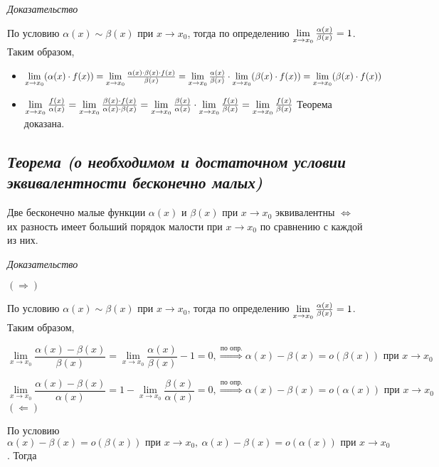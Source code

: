 \textit{Доказательство}

По условию $\alpha(x)\sim\beta(x)$ при $x \rightarrow x_0$, тогда по определению $\lim\limits_{x \to x_0}{\Large\frac{\alpha(x)}{\beta(x)}} = 1$. Таким образом,
\begin{itemize}

\item $\lim\limits_{x \to x_0}(\alpha(x)\cdot f(x)) = \lim\limits_{x \to x_0}{\Large\frac{\alpha(x)\cdot\beta(x)\cdot f(x)}{\beta(x)}} = \lim\limits_{x \to x_0}{\Large\frac{\alpha(x)}{\beta(x)}}\cdot\lim\limits_{x \to x_0}(\beta(x)\cdot f(x)) = \lim\limits_{x \to x_0}(\beta(x)\cdot f(x))$
\item $\lim\limits_{x \to x_0}{\Large\frac{f(x)}{\alpha(x)}} = \lim\limits_{x \to x_0}{\Large\frac{\beta(x)\cdot f(x)}{\alpha(x)\cdot\beta(x)}} = \lim\limits_{x \to x_0}{\Large\frac{\beta(x)}{\alpha(x)}}\cdot\lim\limits_{x \to x_0}{\Large\frac{f(x)}{\beta(x)}} = \lim\limits_{x \to x_0}{\Large\frac{f(x)}{\beta(x)}}$ Теорема доказана.

\end{itemize}
\newpage 
\subsection{\textit{Теорема (о необходимом и достаточном условии эквивалентности бесконечно малых)}}

Две бесконечно малые функции $\alpha(x)$ и $\beta(x)$ при $x \rightarrow x_0$ эквивалентны $\iff$ их разность имеет больший порядок малости при $x \rightarrow x_0$ по сравнению с каждой из них.

\textit{Доказательство}

$(\Rightarrow)$

По условию $\alpha(x) \sim \beta(x)$ при $x \rightarrow x_0$, тогда по определению $\lim\limits_{x \to x_0}{\Large\frac{\alpha(x)}{\beta(x)}} = 1$. Таким образом,

$$\lim\limits_{x \to x_0}{\frac{\alpha(x) - \beta(x)}{\beta(x)}} = \lim\limits_{x \to x_0}{\frac{\alpha(x)}{\beta(x)}} - 1 = 0, \overset{\text{по опр.}}\Rightarrow \alpha(x) - \beta(x) = o (\beta(x)) \text{ при } x \rightarrow x_0$$

$$\lim\limits_{x \to x_0}{\frac{\alpha(x) - \beta(x)}{\alpha(x)}} = 1 - \lim\limits_{x \to x_0}{\frac{\beta(x)}{\alpha(x)}} = 0, \overset{\text{по опр.}}\Rightarrow \alpha(x) - \beta(x) = o (\alpha(x)) \text{ при } x \rightarrow x_0$$ $(\Leftarrow)$

По условию $\alpha(x) - \beta(x) = o (\beta(x)) \text{ при } x \rightarrow x_0, \ \alpha(x) - \beta(x) = o (\alpha(x)) \text{ при } x \rightarrow x_0$. Тогда

